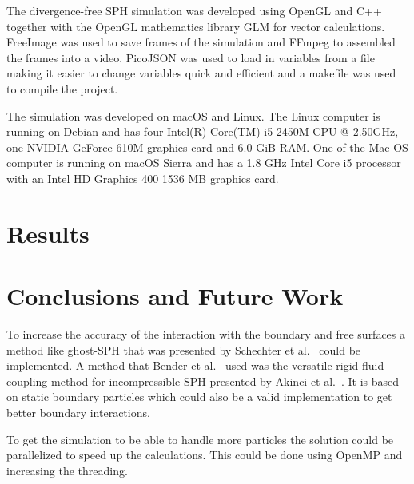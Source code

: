     The divergence-free SPH simulation was developed using OpenGL and C++ together with the OpenGL mathematics library GLM for vector calculations.
    FreeImage was used to save frames of the simulation and FFmpeg to assembled the frames into a video.
    PicoJSON was used to load in variables from a file making it easier to change variables quick and efficient and a makefile was used to compile the project.

    The simulation was developed on macOS and Linux.
    The Linux computer is running on Debian and has four Intel(R) Core(TM) i5-2450M CPU @ 2.50GHz, one NVIDIA GeForce 610M graphics card and 6.0 GiB RAM.
    One of the Mac OS computer is running on macOS Sierra and has a 1.8 GHz Intel Core i5 processor with an Intel HD Graphics 400 1536 MB graphics card.


\section{Results}



\section{Conclusions and Future Work}

    To increase the accuracy of the interaction with the boundary and free surfaces a method like ghost-SPH that was presented by Schechter et al.~\cite{ghost} could be implemented.
    A method that Bender et al.~\cite{bender} used was the versatile rigid fluid coupling method for incompressible SPH presented by Akinci et al.~\cite{akinci2012versatile}.
    It is based on static boundary particles which could also be a valid implementation to get better boundary interactions.

    To get the simulation to be able to handle more particles the solution could be parallelized to speed up the calculations.
    This could be done using OpenMP and increasing the threading.

